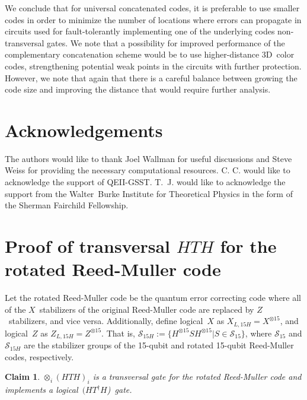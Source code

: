\documentclass[pra,longbibliography,twocolumn,showpacs,nofootinbib,superscriptaddress,notitlepage]{revtex4-1}
\newtheorem{claim}{Claim} \newtheorem{definition}{Definition}
\begin{document}
We conclude that for universal concatenated codes, it is preferable to use smaller codes in order to minimize the number of locations where errors can propagate in circuits used for fault-tolerantly implementing one of the underlying codes non-transversal gates. We note that a possibility for improved performance of the complementary concatenation scheme would be to use higher-distance 3D~color codes, strengthening potential weak points in the circuits with further protection. However, we note that again that there is a careful balance between growing the code size and improving the distance that would require further analysis.

\section{Acknowledgements}
The authors would like to thank Joel Wallman for useful discussions and Steve Weiss for providing the necessary computational resources. C. C. would like to acknowledge the support of QEII-GSST. T.~J. would like to acknowledge the support from the Walter~Burke Institute for Theoretical Physics in the form of the Sherman Fairchild Fellowship.




\clearpage
\appendix

\section{Proof of transversal $HTH$ for the rotated Reed-Muller code}
\label{app:TransversalHTH}

Let the rotated Reed-Muller code be the quantum error correcting code where all of the $X$~stabilizers of the original Reed-Muller code are replaced by $Z$~stabilizers, and vice versa. Additionally, define logical~$X$ as $X_{L,15H} = X^{\otimes 15}$, and logical~$Z$ as $Z_{L, 15H} = Z^{\otimes 15}$. That is, $\mathcal{S}_{15H} := \{ H^{\otimes 15} S H^{\otimes 15} | S \in \mathcal{S}_{15} \}$, where $\mathcal{S}_{15}$ and $\mathcal{S}_{15H}$ are the stabilizer groups of the 15-qubit and rotated 15-qubit Reed-Muller codes, respectively.
\begin{claim}
$\otimes_i (HTH)_i$ is a transversal gate for the rotated Reed-Muller code and implements a logical~$(HT^{\dagger}H$)~gate.
\end{claim}
\end{document}
